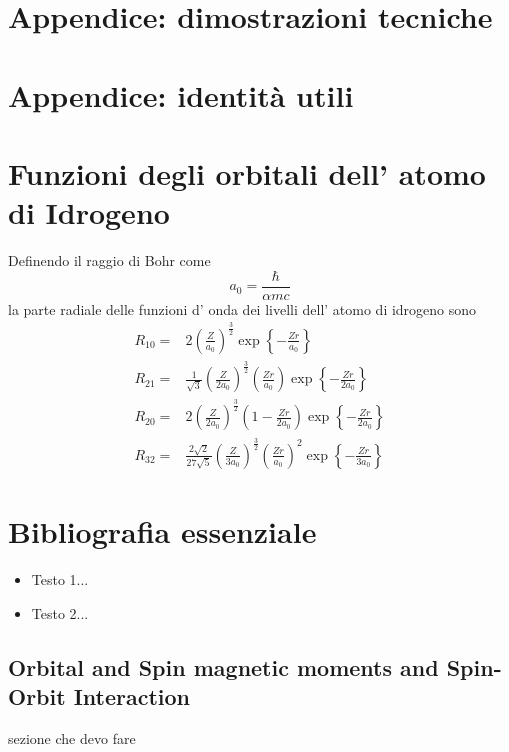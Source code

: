 \documentclass[11pt,a4paper]{article}
\theoremstyle{springer}
\theoremstyle{definition}
\theoremstyle{remark}
\begin{document}
\appendix
\section{Appendice: dimostrazioni tecniche}
\section{Appendice: identità utili}
\section{Funzioni degli orbitali dell' atomo di Idrogeno}
Definendo il raggio di Bohr come 
\begin{equation*}
  a_0 = \frac{\hbar}{\alpha mc}
\end{equation*}
la parte radiale delle funzioni d' onda dei livelli dell' atomo di idrogeno sono
\begin{align*}
  R_{10} =& 2 \left(\frac{Z}{a_0}\right)^\frac{3}{2}\exp\left\{-\frac{Zr}{a_0}\right\}\\
  R_{21} =& \frac{1}{\sqrt{3}} \left(\frac{Z}{2a_0}\right)^\frac{3}{2} \left(\frac{Zr}{a_0}\right)\exp\left\{-\frac{Zr}{2a_0}\right\}\\
  R_{20} =& 2\left(\frac{Z}{2a_0}\right)^\frac{3}{2} \left(1-\frac{Zr}{2a_0}\right)\exp\left\{-\frac{Zr}{2a_0}\right\}\\
R_{32}=&\frac{2 \sqrt{2}}{27 \sqrt{5}}\left(\frac{Z}{3 a_0}\right)^{\frac{3}{2}}\left(\frac{Z r}{a_0}\right)^2 \exp\left\{-\frac{Z r}{ 3 a_0}\right\}
\end{align*}

\section*{Bibliografia essenziale}
\begin{itemize}
  \item Testo 1...
  \item Testo 2...
\end{itemize}


\subsection{Orbital and Spin magnetic moments and Spin-Orbit Interaction}
sezione che devo fare
\end{document}
